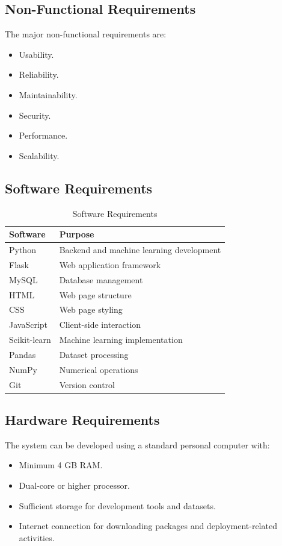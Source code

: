 \documentclass[12pt,a4paper]{report}
\begin{document}
\subsection{Non-Functional Requirements}

The major non-functional requirements are:

\begin{itemize}
    \item Usability.
    \item Reliability.
    \item Maintainability.
    \item Security.
    \item Performance.
    \item Scalability.
\end{itemize}

\subsection{Software Requirements}

\begin{table}[H]
\centering
\caption{Software Requirements}

\begin{tabularx}{\textwidth}{p{}Y}
\toprule
\textbf{Software} & \textbf{Purpose} \\
\midrule
Python & Backend and machine learning development \\
Flask & Web application framework \\
MySQL & Database management \\
HTML & Web page structure \\
CSS & Web page styling \\
JavaScript & Client-side interaction \\
Scikit-learn & Machine learning implementation \\
Pandas & Dataset processing \\
NumPy & Numerical operations \\
Git & Version control \\
\bottomrule
\end{tabularx}
\end{table}

\subsection{Hardware Requirements}

The system can be developed using a standard personal computer
with:
\begin{itemize}
    \item Minimum 4 GB RAM.
    \item Dual-core or higher processor.
    \item Sufficient storage for development tools and datasets.
    \item Internet connection for downloading packages and
    deployment-related activities.
\end{itemize}
\end{document}
